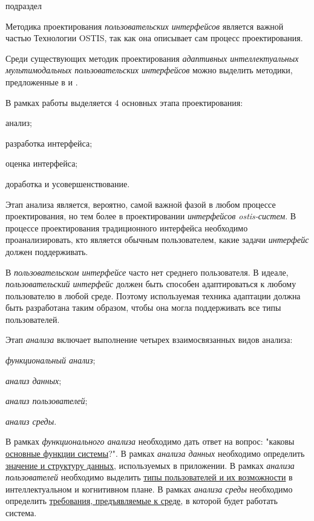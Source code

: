 \begin{SCn}
	\begin{scnrelfromlist}{подраздел}
	\end{scnrelfromlist}
\end{SCn}

Методика проектирования \textit{пользовательских интерфейсов} является важной частью Технологии OSTIS, так как она описывает сам процесс проектирования.

Среди существующих методик проектирования \textit{адаптивных интеллектуальных мультимодальных пользовательских интерфейсов} можно выделить методики,
предложенные в  и  .

В рамках работы  выделяется 4 основных этапа проектирования:
\begin{textitemize}
    \item анализ;
    \item разработка интерфейса;
    \item оценка интерфейса;
    \item доработка и усовершенствование.
\end{textitemize}

Этап анализа является, вероятно, самой важной фазой в любом процессе проектирования, но тем более в проектировании \textit{интерфейсов ostis-систем}. В
процессе проектирования традиционного интерфейса
необходимо проанализировать, кто является обычным пользователем, какие задачи \textit{интерфейс} должен поддерживать. 

В \textit{пользовательском интерфейсе} часто нет среднего пользователя.
В идеале, \textit{пользовательский интерфейс} должен быть способен адаптироваться к любому пользователю в любой среде. Поэтому используемая техника адаптации должна быть разработана таким образом, чтобы она могла поддерживать все типы пользователей.

Этап \textit{анализа} включает выполнение четырех взаимосвязанных видов анализа:
\begin{textitemize}
    \item \textit{функциональный анализ};
    \item \textit{анализ данных};
    \item \textit{анализ пользователей};
    \item \textit{анализ среды}.
\end{textitemize}

В рамках \textit{функционального анализа} необходимо дать ответ на вопрос: "каковы \uline{основные функции системы}?".
В рамках \textit{анализа данных} необходимо определить \uline{значение и структуру данных}, используемых в приложении.
В рамках \textit{анализа пользователей} необходимо выделить \uline{типы пользователей и их возможности} в интеллектуальном
и когнитивном плане.
В рамках \textit{анализа среды} необходимо определить \uline{требования, предъявляемые к среде}, в которой будет работать система.

